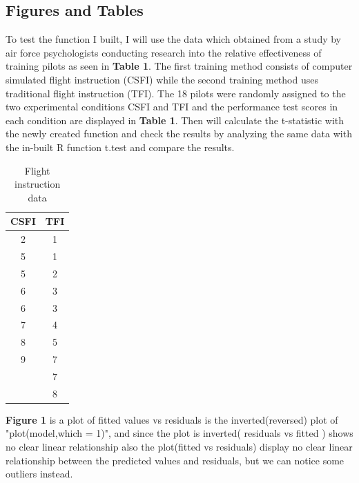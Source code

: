 \documentclass{article}
\begin{document}
\subsection*{Figures and Tables}
 To test the function I built, I will use the data which obtained from a study by air force psychologists conducting research into the relative effectiveness of training pilots as seen in \textbf{Table 1}. The first training method consists of computer simulated flight instruction (CSFI) while the second training method uses traditional flight instruction (TFI). The 18 pilots were randomly assigned to the two experimental conditions CSFI and TFI and the performance test scores in each condition are displayed in \textbf{Table 1}. Then will calculate the t-statistic with the newly created function and check the results by analyzing the same data with the in-built R function t.test and compare the results.
\begin{table}[!h]
    \caption{Flight instruction data}    
    \centering
    \begin{tabular}{cc}
            \hline
            CSFI & TFI\\  
            \hline
            2 & 1 \\ 
            5 & 1 \\
            5 & 2 \\ 
            6 & 3 \\
            6 & 3 \\ 
            7 & 4 \\
            8 & 5 \\ 
            9 & 7 \\
              & 7 \\ 
              & 8 \\
            \hline
            \end{tabular}
    \label{tab:1}
\end{table}
\textbf{Figure 1} is a plot of fitted values vs residuals is the inverted(reversed) plot of "plot(model,which = 1)", and since the plot is inverted( residuals vs fitted ) shows no clear linear relationship also the plot(fitted vs residuals) display no clear linear relationship between the predicted values and residuals, but we can notice some outliers instead.
\end{document}
